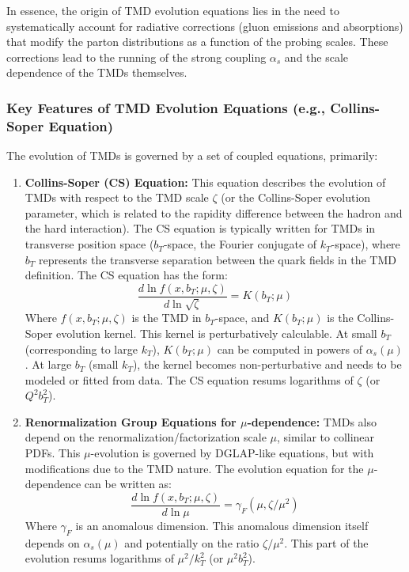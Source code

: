 \documentclass[11pt]{article}
\begin{document}
In essence, the origin of TMD evolution equations lies in the need to systematically account for radiative corrections (gluon emissions and
absorptions) that modify the parton distributions as a function of the probing scales. These corrections lead to the running of the strong coupling
$\alpha_s$ and the scale dependence of the TMDs themselves.

\subsubsection{Key Features of TMD Evolution Equations (e.g., Collins-Soper Equation)}

The evolution of TMDs is governed by a set of coupled equations, primarily:

\begin{enumerate}
  \item \textbf{Collins-Soper (CS) Equation:} This equation describes the evolution of TMDs with respect to the TMD scale $\zeta$ (or the Collins-Soper evolution parameter, which is related to the rapidity difference between the hadron and the hard interaction). The CS equation is typically written for TMDs in transverse position space ($b_T$-space, the Fourier conjugate of $k_T$-space), where $b_T$ represents the transverse separation between the quark fields in the TMD definition.
        The CS equation has the form:
        \begin{equation}
          \frac{d \ln f(x, b_T; \mu, \zeta)}{d \ln \sqrt{\zeta}} = K(b_T; \mu)
          \label{eq:cs_equation}
        \end{equation}
        Where $f(x, b_T; \mu, \zeta)$ is the TMD in $b_T$-space, and $K(b_T; \mu)$ is the Collins-Soper evolution kernel. This kernel is perturbatively calculable. At small $b_T$ (corresponding to large $k_T$), $K(b_T; \mu)$ can be computed in powers of $\alpha_s(\mu)$. At large $b_T$ (small $k_T$), the kernel becomes non-perturbative and needs to be modeled or fitted from data. The CS equation resums logarithms of $\zeta$ (or $Q^2 b_T^2$).

  \item \textbf{Renormalization Group Equations for $\mu$-dependence:} TMDs also depend on the renormalization/factorization scale $\mu$, similar to collinear PDFs. This $\mu$-evolution is governed by DGLAP-like equations, but with modifications due to the TMD nature. The evolution equation for the $\mu$-dependence can be written as:
        \begin{equation}
          \frac{d \ln f(x, b_T; \mu, \zeta)}{d \ln \mu} = \gamma_F(\mu, \zeta/\mu^2)
          \label{eq:mu_evolution}
        \end{equation}
        Where $\gamma_F$ is an anomalous dimension. This anomalous dimension itself depends on $\alpha_s(\mu)$ and potentially on the ratio $\zeta/\mu^2$. This part of the evolution resums logarithms of $\mu^2/k_T^2$ (or $\mu^2 b_T^2$).
\end{enumerate}
\end{document}
